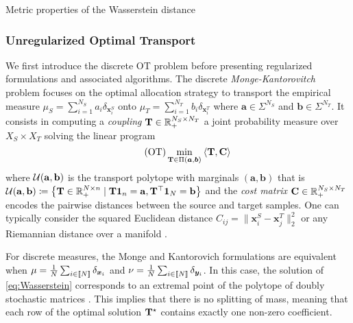 \begin{mem1}{Metric properties of the Wasserstein distance}
    
\end{mem1}


\subsubsection{Unregularized Optimal Transport}


We first introduce the discrete OT problem before presenting regularized formulations and associated algorithms.
 The discrete \emph{Monge-Kantorovitch} problem \citep{kantorovich1942transfer} focuses on the optimal allocation strategy to transport the empirical measure $\mu_S = \sum_{i=1}^{N_S} a_i  \delta_{\bm{x}_i^S}$ onto $\mu_T = \sum_{i=1}^{N_T} b_i  \delta_{\bm{x}_i^T}$ where $\bm{a} \in \Sigma^{N_S}$ and $\bm{b} \in \Sigma^{N_T}$. It consists in computing a \emph{coupling} ${\mathbf{T}} \in \mathbb{R}_{+}^{N_S \times N_T}$ \ie a joint probability measure over $X_S \times X_T$ solving the linear program
\begin{equation}
    \tag{OT}
    \label{eq:OT}
    \min_{{\mathbf{T}} \in \Pi(\bm{a}, \bm{b})} \: \langle {\mathbf{T}}, {\mathbf{C}} \rangle
\end{equation}
where ${\mathcal{U}}({\mathbf{a}}, {\mathbf{b}})$ is the transport polytope with marginals $(\bm{a}, \bm{b})$ that is ${\mathcal{U}}({\mathbf{a}}, {\mathbf{b}}) \coloneqq \left\{ {\mathbf{T}} \in \mathbb{R}_+^{N \times n} \mid {\mathbf{T}} \mathbf{1}_n = {\mathbf{a}}, {\mathbf{T}}^\top \mathbf{1}_N = {\mathbf{b}} \right\}$ and the \emph{cost matrix} $\mathbf{C} \in \mathbb{R}_+^{N_S \times N_T}$ encodes the pairwise distances between the source and target samples. One can typically consider the squared Euclidean distance $C_{ij} = \|\bm{x}^S_{i}-\bm{x}^T_{j}\|_2^2$ or any Riemannian distance over a manifold \citep{villani2009optimal}.

For discrete measures, the Monge and Kantorovich formulations are equivalent when $\mu = \frac{1}{N} \sum_{i \in {[\![N]\!]}} \delta_{\bm{x}_i}$ and $\nu = \frac{1}{N} \sum_{i \in {[\![N]\!]}} \delta_{\bm{y}_i}$. In this case, the solution of \eqref{eq:Wasserstein} corresponds to an extremal point of the polytope of doubly stochastic matrices \citep{bertsimas1997introduction}. This implies that there is no splitting of mass, meaning that each row of the optimal solution ${\mathbf{T}}^\star$ contains exactly one non-zero coefficient.


